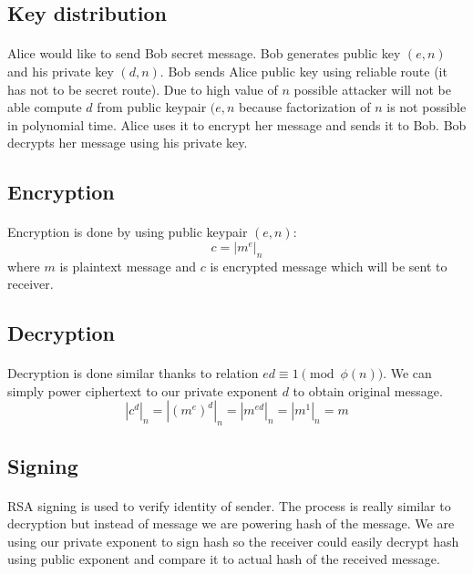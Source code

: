 \documentclass[thesis=B,english]{FITthesis}[2012/10/20]
\begin{document}
{\subsection{Key distribution}
\paragraph*{}
{Alice would like to send Bob secret message. Bob generates public key \((e,n)\) and his private key \((d,n)\). Bob sends Alice public key using reliable route (it has not to be secret route).
Due to high value of \(n\) possible attacker will not be able compute \(d\) from public keypair \((e,n\) because factorization of \(n\) is not possible in polynomial time.
Alice uses it to encrypt her message and sends it to Bob. Bob decrypts her message using his private key.}

\subsection{Encryption}
\paragraph*{}
{Encryption is done by using public keypair \((e, n)\): \[c = | m^e | _n\]
where \(m\) is plaintext message and \(c\) is encrypted message which will be sent to receiver.
}
\subsection{Decryption}
\paragraph*{}
{Decryption is done similar thanks to relation \(ed \equiv 1 \pmod{\phi(n)}\). We can simply power ciphertext to our private exponent \(d\) to obtain original message.  
\[ |c^d|_n = |(m^e)^d|_n = | m^{ed}|_n = |m^1|_n = m\]}

\subsection{Signing}
\paragraph*{}{
RSA signing is used to verify identity of sender. The process is really similar to decryption but instead of message we are powering hash of the message.
We are using our private exponent to sign hash so the receiver could easily decrypt hash using public exponent and compare it to actual hash of the received message.
}

}
\end{document}
